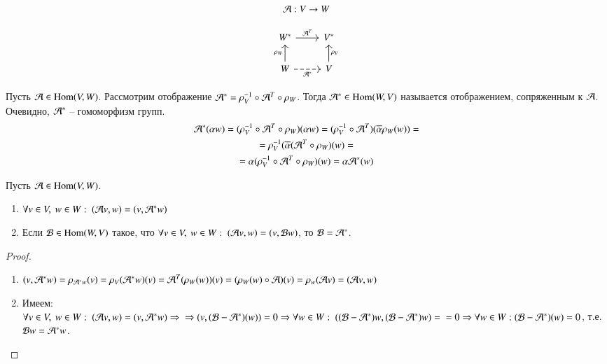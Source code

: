 \documentclass[main]{subfiles}
\begin{document}
\[ \mathcal{A}: V \rightarrow W\]

\[\begin{tikzcd}
        {W^*} & {V^*} \\
        W & V
        \arrow["{\mathcal{A}^T}", from=1-1, to=1-2]
        \arrow["{\rho_V}"', from=2-2, to=1-2]
        \arrow["{\rho_W}", from=2-1, to=1-1]
        \arrow["{\mathcal{A}^*}"', dashed, from=2-1, to=2-2]
    \end{tikzcd}\]

Пусть $\mathcal{A} \in \operatorname{Hom}(V, W)$. Рассмотрим отображение $\mathcal{A}^* = \rho_V^{-1} \circ \mathcal{A}^T \circ \rho_W$. Тогда $\mathcal{A}^* \in \operatorname{Hom}(W, V)$ называется отображением, сопряженным к $\mathcal{A}$.
Очевидно, $\mathcal{A}^*$ -- гомоморфизм групп.
\begin{gather*}
    \mathcal{A}^*(\alpha w) = (\rho_V^{-1} \circ \mathcal{A}^T \circ \rho_W)(\alpha w) = (\rho_V^{-1} \circ \mathcal{A}^T)(\overline{\alpha} \rho_W(w)) = \\
    = \rho_V^{-1} (\overline{\alpha} ( \mathcal{A}^T \circ \rho_W)(w) = \\
    = \alpha (\rho_V^{-1} \circ \mathcal{A}^T \circ \rho_W) (w) = \alpha \mathcal{A}^* (w)
\end{gather*}

\begin{proposition} 
    Пусть $\mathcal{A} \in \operatorname{Hom}(V, W)$.

    \begin{enumerate}
        \item $\forall v \in V, \ w \in W: \ (\mathcal{A} v, w) = (v, \mathcal{A}^* w)$
        \item Если $\mathcal{B} \in \operatorname{Hom} (W, V)$ такое, что $\forall v \in V, \ w \in W: \ (\mca v, w) = (v, \mcb w)$,  то $\mathcal{B} = \mathcal{A}^*$.
    \end{enumerate}
\end{proposition}

\begin{proof}
    \begin{enumerate}
        \item $(v, \mathcal{A}^* w) = \rho_{\mathcal{A}^* w} (v) = \rho_V (\mathcal{A}^*w)(v) = \mathcal{A}^T(\rho_W(w))(v) = (\rho_W(w) \circ \mathcal{A})(v) = \rho_w (\mathcal{A} v) = (\mathcal{A} v, w)$
        \item Имеем: $\forall v \in V, \ w \in W: \ (\mca v, w) = (v, \mca^* w) \Rightarrow \\ \Rightarrow (v, (\mcb - \mca^*)(w)) = 0 \Rightarrow \forall w \in W: \ ((\mcb - \mca^*)w, (\mcb - \mca^*)w) = \\ = 0 \Rightarrow \forall w \in W: (\mcb - \mca^*)(w) = 0$, т.е. $\mathcal{B} w = \mathcal{A}^* w$.
    \end{enumerate}
\end{proof}
\end{document}
